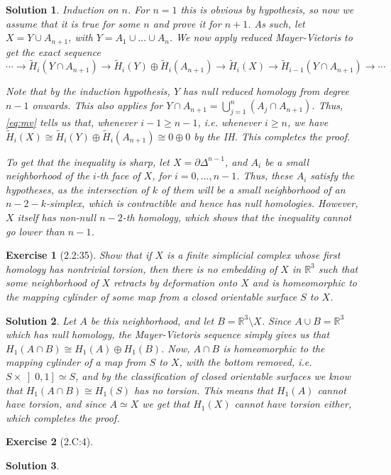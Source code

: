 \documentclass{article}
\theoremstyle{plain}
\newtheorem*{ex}{Exercise}
\theoremstyle{nonumberplain}
\newtheorem{sol}{Solution}
\newcommand{\R}{\mathbb{R}}
\begin{document}
\begin{sol}
Induction on $n$. For $n = 1$ this is obvious by hypothesis, so now we assume that it is true for some $n$ and prove it for $n+1$. As such, let $X = Y \cup A_{n+1}$, with $Y = A_1 \cup \dots \cup A_n$. We now apply reduced Mayer-Vietoris to get the exact sequence
\begin{equation}\label{eq:mv}
\cdots \to \tilde H_i(Y \cap A_{n+1}) \to \tilde H_i(Y) \oplus \tilde H_i(A_{n+1}) \to \tilde H_i(X) \to \tilde H_{i-1}(Y \cap A_{n+1}) \to \cdots
\end{equation}

Note that by the induction hypothesis, $Y$ has null reduced homology from degree $n-1$ onwards. This also applies for $Y \cap A_{n+1} = \bigcup_{j=1}^n (A_j \cap A_{n+1})$. Thus, \eqref{eq:mv} tells us that, whenever $i-1 \geq n-1$, i.e. whenever $i \geq n$, we have $\tilde H_i(X) \cong \tilde H_i(Y) \oplus \tilde H_i(A_{n+1}) \cong 0 \oplus 0$ by the IH. This completes the proof.

To get that the inequality is sharp, let $X = \partial \Delta^{n-1}$, and $A_i$ be a small neighborhood of the $i$-th face of $X$, for $i = 0, \dots, n-1$. Thus, these $A_i$ satisfy the hypotheses, as the intersection of $k$ of them will be a small neighborhood of an $n-2-k$-simplex, which is contractible and hence has null homologies. However, $X$ itself has non-null $n-2$-th homology, which shows that the inequality cannot go lower than $n-1$.
\end{sol}

\begin{ex}[2.2:35]
Show that if $X$ is a finite simplicial complex whose first homology has nontrivial torsion, then there is no embedding of $X$ in $\R^3$ such that some neighborhood of $X$ retracts by deformation onto $X$ and is homeomorphic to the mapping cylinder of some map from a closed orientable surface $S$ to $X$.
\end{ex}

\begin{sol}
Let $A$ be this neighborhood, and let $B = \R^3 \setminus X$. Since $A \cup B = \R^3$ which has null homology, the Mayer-Vietoris sequence simply gives us that $H_1(A \cap B) \cong H_1(A) \oplus H_1(B)$. Now, $A \cap B$ is homeomorphic to the mapping cylinder of a map from $S$ to $X$, with the bottom removed, i.e. $S \times \left]0,1\right] \simeq S$, and by the classification of closed orientable surfaces we know that $H_1(A \cap B) \cong H_1(S)$ has no torsion. This means that $H_1(A)$ cannot have torsion, and since $A \simeq X$ we get that $H_1(X)$ cannot have torsion either, which completes the proof.
\end{sol}

\begin{ex}[2.C:4]
\end{ex}

\begin{sol}
\end{sol}
\end{document}
